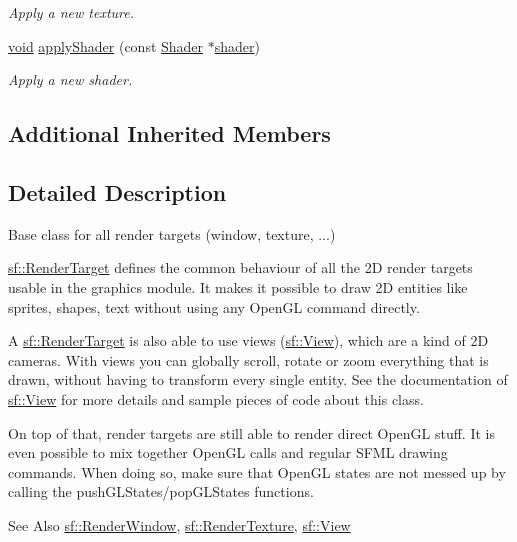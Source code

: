 \begin{DoxyCompactItemize}
\begin{DoxyCompactList}\small\item\em Apply a new texture. \end{DoxyCompactList}\item 
\hyperlink{glutf90_8h_ac778d6f63f1aaf8ebda0ce6ac821b56e}{void} \hyperlink{classsf_1_1_render_target_a6f8bc92f07c70ccd57cbf632fe9de0ba}{apply\-Shader} (const \hyperlink{classsf_1_1_shader}{Shader} $\ast$\hyperlink{gl3_8h_a57b2a96adb1d51204909a82d861e395e}{shader})
\begin{DoxyCompactList}\small\item\em Apply a new shader. \end{DoxyCompactList}\end{DoxyCompactItemize}
\subsection*{Additional Inherited Members}


\subsection{Detailed Description}
Base class for all render targets (window, texture, ...) 

\hyperlink{classsf_1_1_render_target}{sf\-::\-Render\-Target} defines the common behaviour of all the 2\-D render targets usable in the graphics module. It makes it possible to draw 2\-D entities like sprites, shapes, text without using any Open\-G\-L command directly.

A \hyperlink{classsf_1_1_render_target}{sf\-::\-Render\-Target} is also able to use views (\hyperlink{classsf_1_1_view}{sf\-::\-View}), which are a kind of 2\-D cameras. With views you can globally scroll, rotate or zoom everything that is drawn, without having to transform every single entity. See the documentation of \hyperlink{classsf_1_1_view}{sf\-::\-View} for more details and sample pieces of code about this class.

On top of that, render targets are still able to render direct Open\-G\-L stuff. It is even possible to mix together Open\-G\-L calls and regular S\-F\-M\-L drawing commands. When doing so, make sure that Open\-G\-L states are not messed up by calling the push\-G\-L\-States/pop\-G\-L\-States functions.

\begin{DoxySeeAlso}{See Also}
\hyperlink{classsf_1_1_render_window}{sf\-::\-Render\-Window}, \hyperlink{classsf_1_1_render_texture}{sf\-::\-Render\-Texture}, \hyperlink{classsf_1_1_view}{sf\-::\-View} 
\end{DoxySeeAlso}


